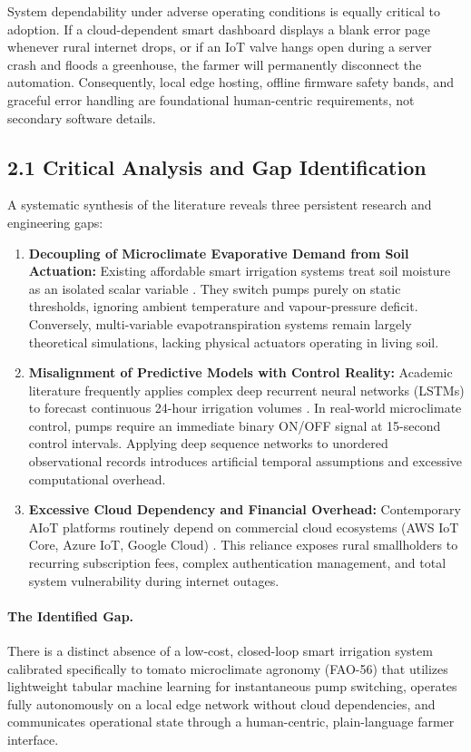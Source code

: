 \documentclass[12pt, a4paper]{article}
\begin{document}
System dependability under adverse operating conditions is equally critical to adoption. If a cloud-dependent smart dashboard displays a blank error page whenever rural internet drops, or if an IoT valve hangs open during a server crash and floods a greenhouse, the farmer will permanently disconnect the automation. Consequently, local edge hosting, offline firmware safety bands, and graceful error handling are foundational human-centric requirements, not secondary software details.

\subsection{2.1 Critical Analysis and Gap Identification}
\label{sec:gap}

A systematic synthesis of the literature reveals three persistent research and engineering gaps:

\begin{enumerate}[leftmargin=1.2cm, itemsep=3pt]
    \item \textbf{Decoupling of Microclimate Evaporative Demand from Soil Actuation:} Existing affordable smart irrigation systems treat soil moisture as an isolated scalar variable \citep{naji2021,singha2025}. They switch pumps purely on static thresholds, ignoring ambient temperature and vapour-pressure deficit. Conversely, multi-variable evapotranspiration systems remain largely theoretical simulations, lacking physical actuators operating in living soil.
    \item \textbf{Misalignment of Predictive Models with Control Reality:} Academic literature frequently applies complex deep recurrent neural networks (LSTMs) to forecast continuous 24-hour irrigation volumes \citep{meng2023}. In real-world microclimate control, pumps require an immediate binary ON/OFF signal at 15-second control intervals. Applying deep sequence networks to unordered observational records introduces artificial temporal assumptions and excessive computational overhead.
    \item \textbf{Excessive Cloud Dependency and Financial Overhead:} Contemporary AIoT platforms routinely depend on commercial cloud ecosystems (AWS IoT Core, Azure IoT, Google Cloud) \citep{li2022}. This reliance exposes rural smallholders to recurring subscription fees, complex authentication management, and total system vulnerability during internet outages.
\end{enumerate}

\paragraph{The Identified Gap.} There is a distinct absence of a low-cost, closed-loop smart irrigation system calibrated specifically to tomato microclimate agronomy (FAO-56) that utilizes lightweight tabular machine learning for instantaneous pump switching, operates fully autonomously on a local edge network without cloud dependencies, and communicates operational state through a human-centric, plain-language farmer interface.
\end{document}
